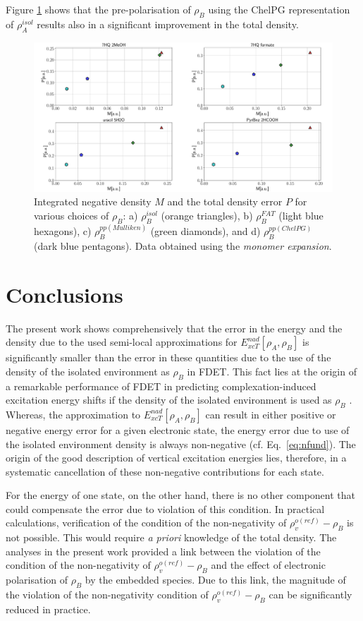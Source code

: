 \documentclass[amsmath,amssymb,preprint,aip,jcp]{revtex4-1}
\begin{document}
Figure \ref{fig:M_vs_P} shows that the pre-polarisation of $\rho_B$ using the ChelPG representation of $\rho_A^{isol}$
results also in a significant improvement in the total density.
\begin{figure}
\centering
\includegraphics[width=1.0\linewidth]{M_vs_P.pdf}
\caption{Integrated negative density $M$ and the total density error $P$ for various choices of $\rho_B$: a) $\rho_B^{isol}$ (orange triangles), b) $\rho_B^{FAT}$ (light blue hexagons), c) $\rho_B^{pp(Mulliken)}$ (green diamonds), and d) $\rho_B^{pp(ChelPG)}$ (dark blue pentagons). Data obtained using the {\it monomer expansion}.}
\label{fig:M_vs_P}
\end{figure}
\section{Conclusions}
The present work shows comprehensively that the error in the energy and the density due to the used semi-local approximations for 
${E}_{xcT}^{nad}[\rho_A,\rho_B]$ is significantly smaller than the error in these quantities due to the use of the density of the isolated environment as $\rho_B$ in FDET. 
This fact lies at the origin of a remarkable performance of FDET in predicting complexation-induced excitation energy shifts  if the density of the isolated environment is used as $\rho_B$ \cite{Ricardi2018}.
Whereas, the approximation to ${E}_{xcT}^{nad}[\rho_A,\rho_B]$ can result in either positive or negative energy error for a given electronic state, the energy error due to  use of the isolated environment density is always non-negative (cf. Eq.~\ref{eq:nfund}). The origin of the good description of vertical excitation energies lies, therefore, in a systematic cancellation of these non-negative contributions for each state.

For the energy of one state, on the other hand, there is no other component that could compensate the error due to violation of this condition. In practical calculations, verification of the condition of the non-negativity of $\rho_v^{o(ref)}-\rho_B$ is not possible. This would require \textit{a priori} knowledge of the total density.
The analyses in the present work provided a link between the violation of the condition of the non-negativity of 
$\rho_v^{o(ref)}-\rho_B$ and the effect of electronic polarisation of $\rho_B$ by the embedded species. Due to this link, the magnitude
of the violation of the non-negativity condition of $\rho_v^{o(ref)}-\rho_B$ can be significantly reduced in practice.
\end{document}
